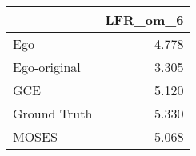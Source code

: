 \begin{tabular}{lr}
\toprule
{} & LFR_om_6 \\
\midrule
Ego          &    4.778 \\
Ego-original &    3.305 \\
GCE          &    5.120 \\
Ground Truth &    5.330 \\
MOSES        &    5.068 \\
\bottomrule
\end{tabular}
